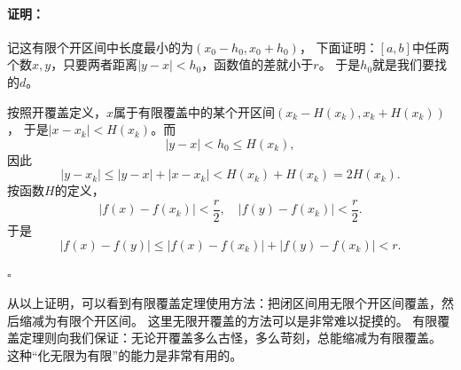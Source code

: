 \documentclass[12pt,UTF8]{ctexbook}
\renewenvironment{proof}{\paragraph{\textbf{证明：}}}{\hfill$\square$}
\begin{document}
\begin{appendix}
\begin{proof}
    记这有限个开区间中长度最小的为$(x_0 - h_0, x_0 + h_0)$，
    下面证明：$[a, b]$中任两个数$x,y$，只要两者距离$|y - x| < h_0$，函数值的差就小于$r$。
    于是$h_0$就是我们要找的$d$。

    按照开覆盖定义，$x$属于有限覆盖中的某个开区间$(x_k - H(x_k), x_k + H(x_k))$，
    于是$|x - x_k| < H(x_k)$。而
    $$|y - x| < h_0 \leqslant H(x_k),$$
    因此
    $$|y - x_k| \leqslant |y - x| + |x - x_k| < H(x_k) + H(x_k) = 2H(x_k).$$
    按函数$H$的定义，
    $$ |f(x) - f(x_k)| < \frac{r}{2}, \quad |f(y) - f(x_k)| < \frac{r}{2}. $$
    于是
    $$ |f(x) - f(y)| \leqslant |f(x) - f(x_k)| + |f(y) - f(x_k)| < r. $$

\end{proof}

从以上证明，可以看到有限覆盖定理使用方法：把闭区间用无限个开区间覆盖，然后缩减为有限个开区间。
这里无限开覆盖的方法可以是非常难以捉摸的。
有限覆盖定理则向我们保证：无论开覆盖多么古怪，多么苛刻，总能缩减为有限覆盖。
这种“化无限为有限”的能力是非常有用的。

\end{appendix}
\end{document}
